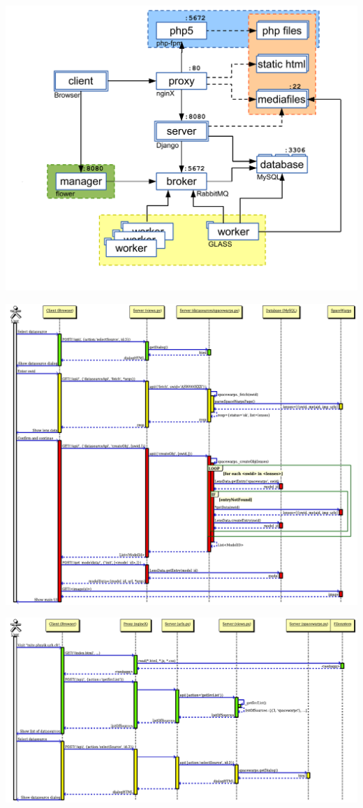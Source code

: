 \documentclass[aspectratio=1610]{beamer}
\begin{document}
\begin{frame}
  \includegraphics[height=\textheight]{../techdoc/fig/whole_setup_com}
\end{frame}
\begin{frame}
  \includegraphics[height=\textheight]{../techdoc/seq/dsinit}
\end{frame}
\begin{frame}
  \includegraphics[width=\textwidth]{../techdoc/seq/init}
\end{frame}
\end{document}
